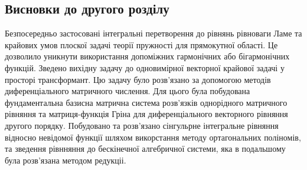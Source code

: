 \subsection{Висновки до другого розділу}
Безпосередньо застосовані інтегральні перетворення до рівнянь рівноваги Ламе та крайових умов плоскої задачі теорії пружності для прямокутної області.
Це дозволило уникнути використання допоміжних гармонічних або бігармонічних функцій.
Зведено вихідну задачу до одновимірної векторної крайової задачі у просторі трансформант.
Цю задачу було розв'язано за допомогою методів диференціального матричного числення.
Для цього була побудована фундаментальна базисна матрична система розв'язків однорідного матричного рівняння та матриця-функція Гріна для диференціального векторного рівняння другого порядку.
Побудовано та розв'язано сінгульрне інтегральне рівняння відносно невідомої функції шляхом викорстання методу ортагональних поліномів, та зведення рівнняння до бескінечної алгебричної системи,
яка в подальшому була розв'язана методом редукціі.
